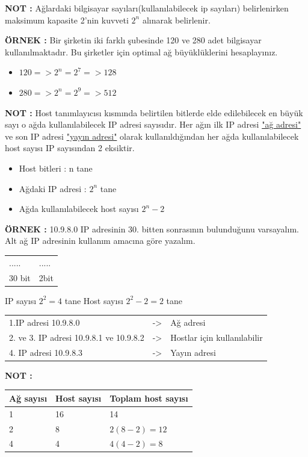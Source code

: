 \textbf{NOT : }Ağlardaki bilgisayar sayıları(kullanılabilecek ip sayıları) belirlenirken maksimum kapasite 2'nin kuvveti ${2^n}$ %
alınarak belirlenir. 

\textbf{ÖRNEK : }Bir şirketin iki farklı şubesinde 120 ve 280 adet bilgisayar kullanılmaktadır. Bu şirketler için optimal ağ büyüklüklerini hesaplayınız. 

\begin{itemize}
\item[]$120 => 2^n = 2^7 => 128$
\item[]$280 => 2^n = 2^9 => 512$
\end{itemize}

\textbf{NOT : }Host tanımlayıcısı kısmında belirtilen bitlerde elde edilebilecek en büyük sayı o ağda kullanılabilecek IP adresi sayısıdır. Her ağın ilk IP adresi \underline{"ağ adresi"} ve son IP adresi \underline{"yayın adresi"} olarak kullanıldığından her ağda kullanılabilecek host sayısı IP sayısından 2 eksiktir.
\begin{itemize}
\item[] Host bitleri : n tane 
\item[] Ağdaki IP adresi : $2^n$ tane 
\item[] Ağda kullanılabilecek host sayısı $2^n-2$
\end{itemize}

\textbf{ÖRNEK : } 10.9.8.0 IP adresinin 30. bitten sonrasının bulunduğunu varsayalım. Alt ağ IP adresinin kullanım amacına göre yazalım. 

\begin{tabular}{ll}
..... & ..... \\
30 bit& 2bit\\
\end{tabular}

IP sayısı $2^2=4$ tane
Host sayısı $2^2-2=2$ tane


\begin{tabular}{lll}
1.IP adresi 10.9.8.0 & ->& Ağ adresi \\
2. ve 3. IP adresi 10.9.8.1 ve 10.9.8.2 & -> & Hostlar için kullanılabilir \\
4. IP adresi 10.9.8.3 & -> & Yayın adresi 
\end{tabular}

\textbf{NOT : }

\begin{tabular}{ll|l}
Ağ sayısı & Host sayısı &Toplam host sayısı\\
\hline 
1&16&14 \\
2 & 8 & $2(8-2) =12$ \\
4&4&$4(4-2) = 8$ \\
\end{tabular}


